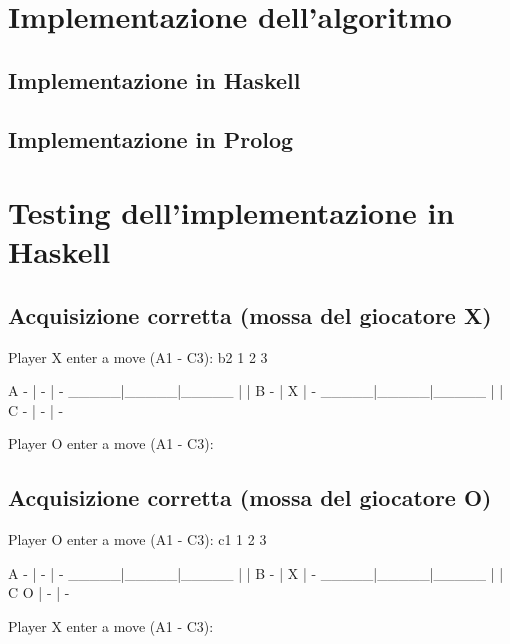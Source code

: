 \documentclass{article}
\begin{document}
\section{Implementazione dell'algoritmo}

\subsection{Implementazione in Haskell}


\newpage
\subsection{Implementazione in Prolog}


\newpage

\section{Testing dell'implementazione in Haskell}

\subsection{Acquisizione corretta (mossa del giocatore X)}
    \begin{spverbatim}
    Player X enter a move (A1 - C3): 
    b2
         1     2     3

    A    -  |  -  |  -  
       _____|_____|_____
            |     |     
    B    -  |  X  |  -  
       _____|_____|_____
            |     |     
    C    -  |  -  |  -  

    Player O enter a move (A1 - C3): 
    \end{spverbatim}

\subsection{Acquisizione corretta (mossa del giocatore O)}
    \begin{spverbatim}
    Player O enter a move (A1 - C3): 
    c1
         1     2     3

    A    -  |  -  |  -  
       _____|_____|_____
            |     |     
    B    -  |  X  |  -  
       _____|_____|_____
            |     |     
    C    O  |  -  |  -  

    Player X enter a move (A1 - C3): 
    \end{spverbatim}
\end{document}
